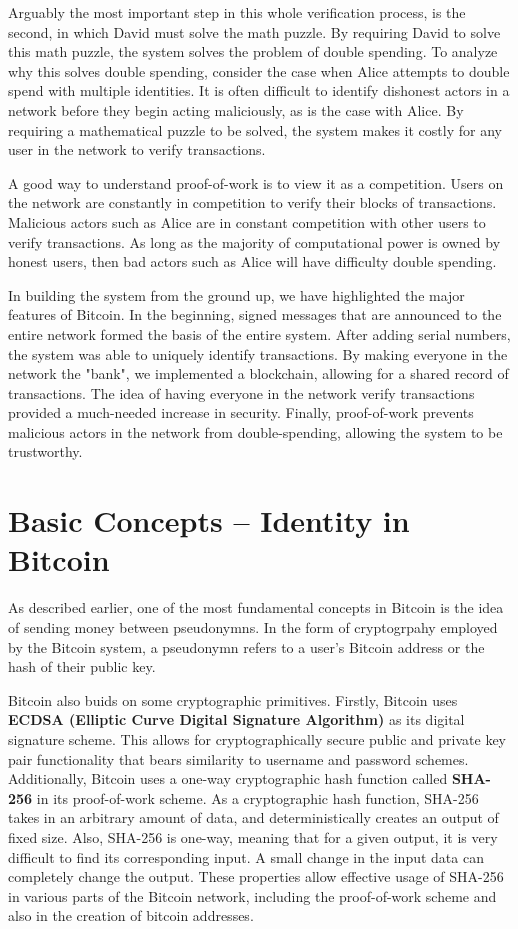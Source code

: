 \documentclass[11pt]{article}
\begin{document}
    Arguably the most important step in this whole verification process, is the second, in which David must solve the math puzzle. By requiring David to solve this math puzzle, the system solves the problem of double spending. To analyze why this solves double spending, consider the case when Alice attempts to double spend with multiple identities. It is often difficult to identify dishonest actors in a network before they begin acting maliciously, as is the case with Alice. By requiring a mathematical puzzle to be solved, the system makes it costly for any user in the network to verify transactions. 
    
    A good way to understand proof-of-work is to view it as a competition. Users on the network are constantly in competition to verify their blocks of transactions. Malicious actors such as Alice are in constant competition with other users to verify transactions. As long as the majority of computational power is owned by honest users, then bad actors such as Alice will have difficulty double spending.
    
    In building the system from the ground up, we have highlighted the major features of Bitcoin. In the beginning, signed messages that are announced to the entire network formed the basis of the entire system. After adding serial numbers, the system was able to uniquely identify transactions. By making everyone in the network the "bank", we implemented a blockchain, allowing for a shared record of transactions. The idea of having everyone in the network verify transactions provided a much-needed increase in security. Finally, proof-of-work prevents malicious actors in the network from double-spending, allowing the system to be trustworthy. 
    
    \section*{Basic Concepts -- Identity in Bitcoin}
    
    As described earlier, one of the most fundamental concepts in Bitcoin is the idea of sending money between pseudonymns. In the form of cryptogrpahy employed by the Bitcoin system, a pseudonymn refers to a user's Bitcoin address or the hash of their public key. 
    
    Bitcoin also buids on some cryptographic primitives. Firstly, Bitcoin uses \textbf{ECDSA (Elliptic Curve Digital Signature Algorithm)} as its digital signature scheme. This allows for cryptographically secure public and private key pair functionality that bears similarity to username and password schemes. Additionally, Bitcoin uses a one-way cryptographic hash function called \textbf{SHA-256} in its proof-of-work scheme. As a cryptographic hash function, SHA-256 takes in an arbitrary amount of data, and deterministically creates an output of fixed size. Also, SHA-256 is one-way, meaning that for a given output, it is very difficult to find its corresponding input. A small change in the input data can completely change the output. These properties allow effective usage of SHA-256 in various parts of the Bitcoin network, including the proof-of-work scheme and also in the creation of bitcoin addresses.   
    
\end{document}
